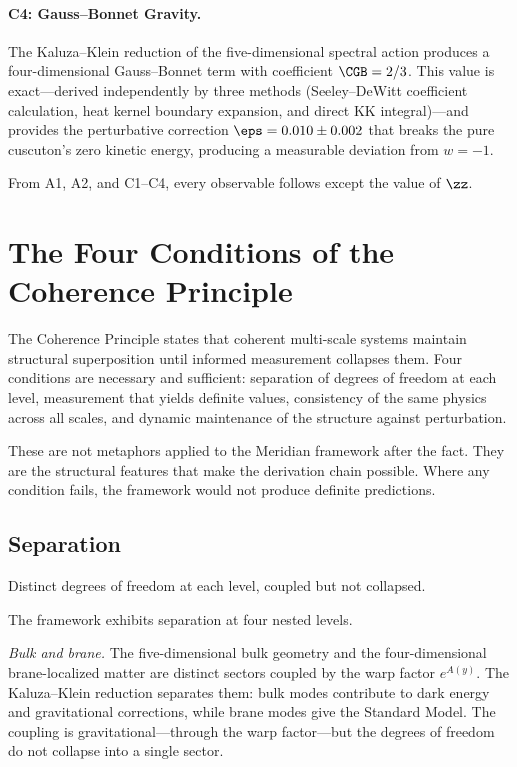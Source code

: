 \paragraph{C4: Gauss--Bonnet Gravity.}
The Kaluza--Klein reduction of the five-dimensional spectral action
produces a four-dimensional Gauss--Bonnet term with coefficient
$\CGB = 2/3$. This value is exact---derived independently by three
methods (Seeley--DeWitt coefficient calculation, heat kernel boundary
expansion, and direct KK integral)---and provides the perturbative
correction $\eps = 0.010 \pm 0.002$ that breaks the pure cuscuton's
zero kinetic energy, producing a measurable deviation from $w = -1$.

From A1, A2, and C1--C4, every observable follows except the value of
$\zz$.

\section{The Four Conditions of the Coherence Principle}
\label{sec:0-coherence}

The Coherence Principle states that coherent multi-scale systems
maintain structural superposition until informed measurement collapses
them. Four conditions are necessary and sufficient: separation of
degrees of freedom at each level, measurement that yields definite
values, consistency of the same physics across all scales, and dynamic
maintenance of the structure against perturbation.

These are not metaphors applied to the Meridian framework after the
fact. They are the structural features that make the derivation chain
possible. Where any condition fails, the framework would not produce
definite predictions.

\subsection{Separation}
\label{sec:0-separation}

Distinct degrees of freedom at each level, coupled but not collapsed.

The framework exhibits separation at four nested levels.

\textit{Bulk and brane.} The five-dimensional bulk geometry and the
four-dimensional brane-localized matter are distinct sectors coupled
by the warp factor $e^{A(y)}$. The Kaluza--Klein reduction separates
them: bulk modes contribute to dark energy and gravitational
corrections, while brane modes give the Standard Model. The coupling
is gravitational---through the warp factor---but the degrees of
freedom do not collapse into a single sector.


